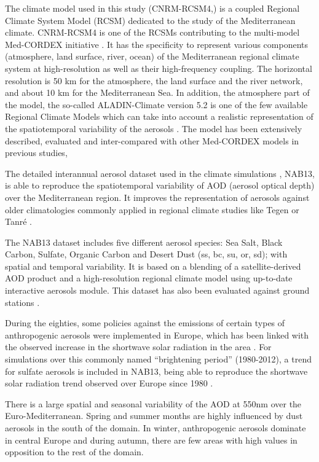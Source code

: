 The climate model used in this study (CNRM-RCSM4,\cite*{Sevault2014}) is a coupled Regional Climate System Model (RCSM) dedicated to the study of the Mediterranean climate. CNRM-RCSM4 is one of the RCSMs contributing to the multi-model Med-CORDEX initiative \cite*{Ruti2016}. It has the specificity to represent various components (atmosphere, land surface, river, ocean) of the Mediterranean regional climate system at high-resolution as well as their high-frequency coupling. The horizontal resolution is 50 km for the atmosphere, the land surface and the river network, and about 10 km for the Mediterranean Sea. In addition, the atmosphere part of the model, the so-called ALADIN-Climate version 5.2 \cite*{Colin2010} is one of the few available Regional Climate Models which can take into account a realistic representation of the spatiotemporal variability of the aerosols \cite*{Nabat2015}. The model has been extensively described, evaluated and inter-compared with other Med-CORDEX models in previous studies, \cite{Sevault2014, Nabat2013, Nabat2015,Flaounas2016, Gaertner2016, DellAquila2016, Harzallah2016, Cavicchia2016}

The detailed interannual aerosol dataset used in the climate simulations \cite*{Nabat2013}, NAB13, is able to reproduce the spatiotemporal variability of AOD (aerosol optical depth) over the Mediterranean region. It improves the representation of aerosols against older climatologies commonly applied in regional climate studies like Tegen \cite*{Tegen1997} or Tanré \cite*{tanre1984}.

The NAB13 dataset includes five different aerosol species: Sea Salt, Black Carbon, Sulfate, Organic Carbon and Desert Dust (ss, bc, su, or, sd); with spatial and temporal variability. It is based on a blending of a satellite-derived AOD product and a high-resolution regional climate model using up-to-date interactive aerosols module. This dataset has also been evaluated against ground stations \cite*{Nabat2013}.

During the eighties, some policies against the emissions of certain types of anthropogenic aerosols were implemented in Europe, which has been linked with the observed increase in the shortwave solar radiation in the area \cite*{Wild2005}. For simulations over this commonly named ``brightening period'' (1980-2012), a trend for sulfate aerosols is included in NAB13, being able to reproduce the shortwave solar radiation trend observed over Europe since 1980 \cite*{Nabat2013}.

There is a large spatial and seasonal variability of the AOD at 550nm over the Euro-Mediterranean. Spring and summer months are highly influenced by dust aerosols in the south of the domain. In winter, anthropogenic aerosols dominate in central Europe and during autumn, there are few areas with high values in opposition to the rest of the domain.

